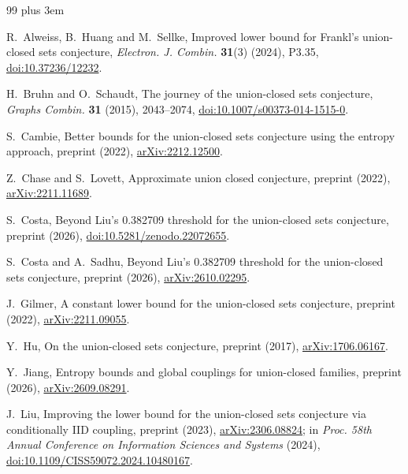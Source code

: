 \documentclass[aps,prd,twocolumn,superscriptaddress,nofootinbib,longbibliography,floatfix,amsmath,amssymb,10pt]{revtex4-2}
\theoremstyle{plain}
\theoremstyle{definition}
\theoremstyle{plain}
\begin{document}
\begin{thebibliography}{99}\rightskip=0pt plus 3em

 R.~Alweiss, B.~Huang and M.~Sellke, Improved lower bound for Frankl's union-closed sets conjecture, \emph{Electron. J. Combin.} \textbf{31}(3) (2024), P3.35, \href{https://doi.org/10.37236/12232}{doi:10.37236/12232}.

 H.~Bruhn and O.~Schaudt, The journey of the union-closed sets conjecture, \emph{Graphs Combin.} \textbf{31} (2015), 2043--2074, \href{https://doi.org/10.1007/s00373-014-1515-0}{doi:10.1007/s00373-014-1515-0}.

 S.~Cambie, Better bounds for the union-closed sets conjecture using the entropy approach, preprint (2022), \href{https://arxiv.org/abs/2212.12500}{arXiv:2212.12500}.

 Z.~Chase and S.~Lovett, Approximate union closed conjecture, preprint (2022), \href{https://arxiv.org/abs/2211.11689}{arXiv:2211.11689}.

 S.~Costa, Beyond Liu's 0.382709 threshold for the union-closed sets conjecture, preprint (2026), \href{https://doi.org/10.5281/zenodo.22072655}{doi:10.5281/zenodo.22072655}.

 S.~Costa and A.~Sadhu, Beyond Liu's 0.382709 threshold for the union-closed sets conjecture, preprint (2026), \href{https://arxiv.org/abs/2610.02295}{arXiv:2610.02295}.

 J.~Gilmer, A constant lower bound for the union-closed sets conjecture, preprint (2022), \href{https://arxiv.org/abs/2211.09055}{arXiv:2211.09055}.

 Y.~Hu, On the union-closed sets conjecture, preprint (2017), \href{https://arxiv.org/abs/1706.06167}{arXiv:1706.06167}.

 Y.~Jiang, Entropy bounds and global couplings for union-closed families, preprint (2026), \href{https://arxiv.org/abs/2609.08291}{arXiv:2609.08291}.

 J.~Liu, Improving the lower bound for the union-closed sets conjecture via conditionally IID coupling, preprint (2023), \href{https://arxiv.org/abs/2306.08824}{arXiv:2306.08824}; in \emph{Proc. 58th Annual Conference on Information Sciences and Systems} (2024), \href{https://doi.org/10.1109/CISS59072.2024.10480167}{doi:10.1109/CISS59072.2024.10480167}.


\end{thebibliography}
\end{document}
